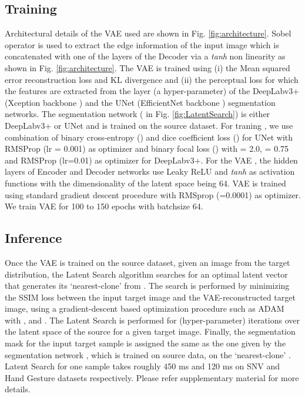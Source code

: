 \documentclass[runningheads]{llncs}
\begin{document}
\subsection{Training}
Architectural details of the VAE used are shown in Fig. \ref{fig:architecture}. Sobel operator is used to extract the edge information of the input image which is concatenated with one of the layers of the Decoder via a \textit{tanh} non linearity as shown in Fig. \ref{fig:architecture}. The VAE is trained using (i) the Mean squared error reconstruction loss  and KL divergence  and (ii) the perceptual loss  for which the features are extracted from the  layer (a hyper-parameter) of the DeepLabv3+ \cite{deeplabv3plus2018} (Xception backbone \cite{chollet2017xception}) and the UNet \cite{ronneberger2015u} (EfficientNet backbone \cite{tan2019efficientnet}) segmentation networks. The segmentation network ( in Fig. \ref{fig:LatentSearch}) is either DeepLabv3+ or UNet  and is trained on the source dataset. For traning , we use combination of binary cross-entropy () and dice coefficient loss () for UNet with RMSProp (lr = 0.001) as optimizer and  binary focal loss () \cite{lin2017focal} with  = 2.0,  = 0.75 and RMSProp (lr=0.01) as optimizer for DeepLabv3+. 
For the VAE , the hidden layers of Encoder and Decoder networks use Leaky ReLU and \textit{tanh} as activation functions with the dimensionality of the latent space being 64. VAE is trained using standard gradient descent procedure with RMSprop (=0.0001) as optimizer. We train VAE for 100 to 150 epochs with batchsize 64. 
\subsection{Inference}
Once the VAE is trained on the source dataset, given an image  from the target distribution,
the Latent Search algorithm searches for an optimal latent vector  that generates its `nearest-clone'  from . The search is performed by minimizing the SSIM loss  between the input target image  and the VAE-reconstructed target image, using a gradient-descent based optimization procedure such as  ADAM \cite{kingma2014adam} with ,  and . The Latent Search is performed for  (hyper-parameter) iterations over the latent space of the source for a given target image. Finally, the segmentation mask for the input target sample is assigned the same as the one given by the segmentation network , which is trained on source data, on the `nearest-clone' . 
Latent Search for one sample takes roughly 450 ms and 120 ms on SNV and Hand Gesture datasets respectively. Please refer supplementary material for more details.
\end{document}
